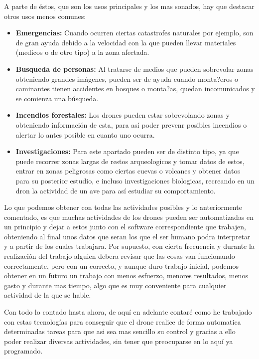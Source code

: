 \documentclass{article}
\begin{document}
A parte de \'estos, que son los usos principales y los mas sonados, hay que destacar otros usos menos comunes:
\begin{itemize}
	\item \textbf{Emergencias:} Cuando ocurren ciertas catastrofes naturales por ejemplo, son de gran ayuda debido a la velocidad con la que pueden llevar materiales (medicos o de otro tipo) a la zona afectada.

	\item \textbf{Busqueda de personas:} Al tratarse de medios que pueden sobrevolar zonas obteniendo grandes im\'agenes, pueden ser de ayuda cuando monta?eros o caminantes tienen accidentes en bosques o monta?as, quedan incomunicados y se comienza una b\'usqueda.

	\item \textbf{Incendios forestales:} Los drones pueden estar sobrevolando zonas y obteniendo informaci\'on de esta, para as\'i poder prevenr posibles incendios o alertar lo antes posible en cuanto uno ocurra. 

\item \textbf{Investigaciones:} Para este apartado pueden ser de distinto tipo, ya que puede recorrer zonas largas de restos arqueologicos y tomar datos de estos, entrar en zonas peligrosas como ciertas cuevas o volcanes y obtener datos para su posterior estudio, e incluso investigaciones biologicas, recreando en un dron la actividad de un ave para as\'i estudiar su comportamiento.
\end{itemize}
 
\hspace{1 cm} Lo que podemos obtener con todas las actividades posibles y lo anteriormente comentado, es que muchas actividades de los drones pueden ser automatizadas en un principio y dejar a estos junto con el software correspondiente que trabajen, obteniendo al final unos datos que seran los que el ser humano podra interpretar y a partir de los cuales trabajara. Por supuesto, con cierta frecuencia y durante la realizaci\'on del trabajo alguien debera revisar que las cosas van funcionando correctamente, pero con un correcto, y aunque duro trabajo inicial, podemos obtener en un futuro un trabajo con menos esfuerzo, menores resultados, menos gasto y durante mas tiempo, algo que es muy conveniente para cualquier actividad de la que se hable. 

\hspace{1 cm} Con todo lo contado hasta ahora, de aqu\'i en adelante contar\'e como he trabajado con estas tecnolog\'ias para conseguir que el drone realice de forma automatica determinadas tareas para que asi sea mas sencillo su control y gracias a ello poder realizar diversas actividades, sin tener que preocuparse en lo aqu\'i ya programado. 
\end{document}
